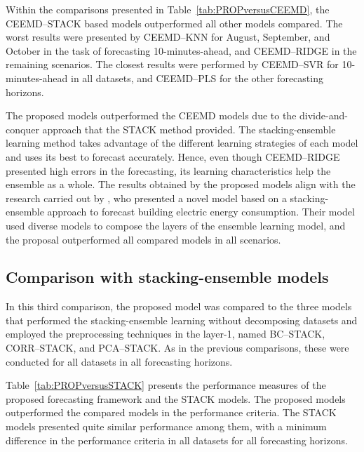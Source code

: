 % 

Within the comparisons presented in Table~\ref{tab:PROPversusCEEMD}, the \ac{CEEMD}--\ac{STACK} based models outperformed all other models compared. The worst results were presented by \ac{CEEMD}--\ac{KNN} for August, September, and October in the task of forecasting 10-minutes-ahead, and \ac{CEEMD}--\ac{RIDGE} in the remaining scenarios. The closest results were performed by \ac{CEEMD}--\ac{SVR} for 10-minutes-ahead in all datasets, and \ac{CEEMD}--\ac{PLS} for the other forecasting horizons.

The proposed models outperformed the \ac{CEEMD} models due to the divide-and-conquer approach that the \ac{STACK} method provided. The stacking-ensemble learning method takes advantage of the different learning strategies of each model and uses its best to forecast accurately. Hence, even though \ac{CEEMD}--\ac{RIDGE} presented high errors in the forecasting, its learning characteristics help the ensemble as a whole. The results obtained by the proposed models align with the research carried out by , who presented a novel model based on a stacking-ensemble approach to forecast building electric energy consumption. Their model used diverse models to compose the layers of the ensemble learning model, and the proposal outperformed all compared models in all scenarios.

\subsection{Comparison with stacking-ensemble models \label{subsec:propVSstack}}

In this third comparison, the proposed model was compared to the three models that performed the stacking-ensemble learning without decomposing datasets and employed the preprocessing techniques in the layer-1, named \ac{BC}--\ac{STACK}, \ac{CORR}--\ac{STACK}, and \ac{PCA}--\ac{STACK}. As in the previous comparisons, these were conducted for all datasets in all forecasting horizons.

% 

Table~\ref{tab:PROPversusSTACK} presents the performance measures of the proposed forecasting framework and the \ac{STACK} models. The proposed models outperformed the compared models in the performance criteria. The \ac{STACK} models presented quite similar performance among them, with a minimum difference in the performance criteria in all datasets for all forecasting horizons.


